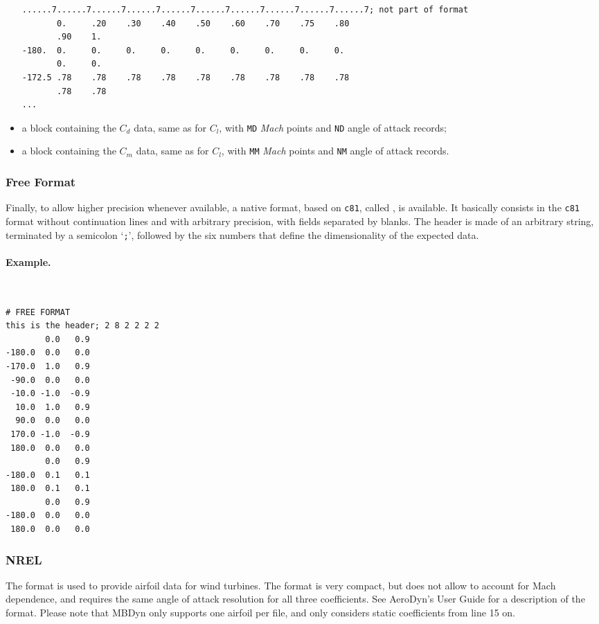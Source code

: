 \begin{itemize}
{\begin{verbatim}
......7......7......7......7......7......7......7......7......7......7; not part of format
       0.     .20    .30    .40    .50    .60    .70    .75    .80
       .90    1.
-180.  0.     0.     0.     0.     0.     0.     0.     0.     0.
       0.     0.
-172.5 .78    .78    .78    .78    .78    .78    .78    .78    .78
       .78    .78
...
\end{verbatim}
}
\item a block containing the $C_d$ data, same as for $C_l$,
with \texttt{MD} \emph{Mach} points and \texttt{ND} angle of attack records;
\item a block containing the $C_m$ data, same as for $C_l$,
with \texttt{MM} \emph{Mach} points and \texttt{NM} angle of attack records.
\end{itemize}

\subsubsection{Free Format}
Finally, to allow higher precision whenever available, a native format,
based on \texttt{c81}, called , is available.
It basically consists in the \texttt{c81} format without continuation lines
and with arbitrary precision, with fields separated by blanks.
The header is made of an arbitrary string, terminated by a semicolon `\texttt{;}',
followed by the six numbers that define the dimensionality of the expected data.

\paragraph{Example.} \
\begin{verbatim}
# FREE FORMAT
this is the header; 2 8 2 2 2 2
        0.0   0.9
-180.0  0.0   0.0
-170.0  1.0   0.9
 -90.0  0.0   0.0
 -10.0 -1.0  -0.9
  10.0  1.0   0.9
  90.0  0.0   0.0
 170.0 -1.0  -0.9
 180.0  0.0   0.0
        0.0   0.9
-180.0  0.1   0.1
 180.0  0.1   0.1
        0.0   0.9
-180.0  0.0   0.0
 180.0  0.0   0.0
\end{verbatim}

\subsubsection{NREL}
The  format is used to provide airfoil data for wind turbines.
The format is very compact, but does not allow to account for Mach
dependence, and requires the same angle of attack resolution
for all three coefficients.
See AeroDyn's User Guide \cite{AERODYN-UG-2002} for a description
of the format.
Please note that MBDyn only supports one airfoil per file,
and only considers static coefficients from line 15 on.

